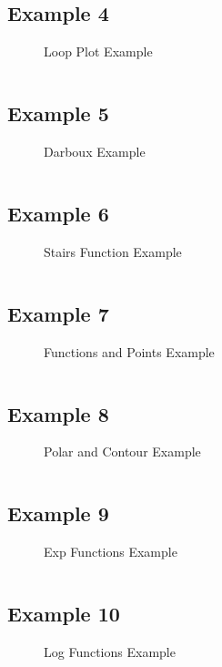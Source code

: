 \subsection{Example 4}
\begin{figure}[!htb]
    \centering
    
    \caption{Loop Plot Example}
    \label{fig:4-loop-to-plot-function}
\end{figure}
\inputminted{latex}{./Example/example_4.tex}
\newpage

\subsection{Example 5}
\begin{figure}[!htb]
    \centering
    
    \caption{Darboux Example}
    \label{fig:5-darboux-function}
\end{figure}
\inputminted{latex}{./Example/example_5.tex}
\newpage


\subsection{Example 6}
\begin{figure}[!htb]
    \centering
    
    \caption{Stairs Function Example}
    \label{fig:6-stairs-function}
\end{figure}
\inputminted{latex}{./Example/example_6.tex}
\newpage


\subsection{Example 7}
\begin{figure}[!htb]
    \centering
    
    \caption{Functions and Points Example}
    \label{fig:7-points-function}
\end{figure}
\inputminted{latex}{./Example/example_7.tex}
\newpage


\subsection{Example 8}
\begin{figure}[!htb]
    \centering
    
    \caption{Polar and Contour Example}
    \label{fig:polar-contour-plot}
\end{figure}
\inputminted{latex}{./Example/example_8.tex}
\newpage


\subsection{Example 9}
\begin{figure}[!htb]
    \centering
    
    \caption{Exp Functions Example}
    \label{fig:9-exp-functions}
\end{figure}
\inputminted{latex}{./Example/example_9.tex}
\newpage



\subsection{Example 10}
\begin{figure}[!htb]
    \centering
    
    \caption{Log Functions Example}
    \label{fig:10-log-function}
\end{figure}
\inputminted{latex}{./Example/example_10.tex}
\newpage
